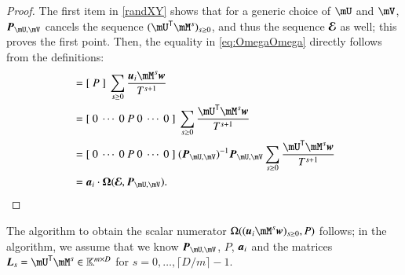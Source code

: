 \documentclass[final,1p,times,authoryear]{elsarticle}
\newcommand{\mat}[1]{\bm{\MakeUppercase{#1}}} %
\newcommand{\row}[1]{\bm{\MakeLowercase{#1}}} %
\newcommand{\col}[1]{\bm{\MakeLowercase{#1}}} %
\newcommand{\minpoly}{P}
\newcommand{\trsp}[1]{#1^{\mathsf{T}}} %
\def\K{\mathbb{K}}
\def\K {\ensuremath{\mathbb{K}}}
\newcommand{\mUt}{\trsp{\mU}}
\begin{document}
\begin{proof}
  The first item in \cref{randXY} shows that for a generic choice of
  $\mU$ and $\mV$, $\mat{P}_{\mU,\mV}$ cancels the sequence $(\mUt
  \mM^s)_{s \ge 0}$, and thus the sequence $\mat{\mathcal{E}}$ as well;
  this proves the first point. Then, the equality
  in \cref{eq:OmegaOmega} directly follows from the definitions:
  \begin{align*}
    [~ \Omega((\row{u}_i \mM^s \col{w})_{s \ge 0}, \minpoly)~]  &= [~\minpoly~]\ \sum_{s \ge 0} \frac{\row{u}_i \mM^s \col{w}}{T^{s+1}}\\
                                                                &=  [~0~\cdots~0~\minpoly~0~\cdots~0~]\  \sum_{s \ge 0} \frac{\mUt \mM^s \col{w}}{T^{s+1}}\\
                                                                &=  [~0~\cdots~0~\minpoly~0~\cdots~0~]\ (\mat{P}_{\mU,\mV})^{-1} \mat{P}_{\mU,\mV} \sum_{s \ge 0} \frac{\mUt \mM^s \col{w}}{T^{s+1}}\\
                                                                &=  \row{a}_i\cdot \mat{\Omega}(\mat{\mathcal{E}}, \mat{P}_{\mU,\mV}).
                                                                \qedhere
  \end{align*}
\end{proof}

The algorithm to obtain the scalar numerator $\Omega((\row{u}_i \mM^s
\col{w})_{s \ge 0}, \minpoly)$ follows; in the algorithm, we
assume that we know $\mat{P}_{\mU,\mV}$, $P$, $\row{a}_i$ and the
matrices $\mat{L}_s=\mUt \mM^s \in \K^{m \times D}$ for
$s=0,\dots,\lceil D/m \rceil-1$.
\end{document}
